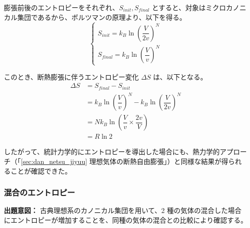\documentclass[uplatex,dvipdfmx,a4paper,11pt]{jsarticle}
\begin{document}
膨張前後のエントロピーをそれぞれ、$S_{init}, S_{final}$ とすると、対象はミクロカノニカル集団であるから、ボルツマンの原理より、以下を得る。
\begin{equation*}
\begin{cases}
S_{init} = k_B \ln \left( \dfrac{V}{2v} \right)^N \\[10pt]
S_{final} = k_B \ln\left( \dfrac{V}{v} \right)^N
\end{cases}
\end{equation*}

このとき、断熱膨張に伴うエントロピー変化 $\Delta S$ は、以下となる。
\begin{align*}
\Delta S 
	&= S_{final} - S_{init} \\
	&= k_B \ln\left( \dfrac{V}{v} \right)^N - k_B \ln \left( \dfrac{V}{2v} \right)^N \\
	&= N k_B \ln \left( \dfrac{V}{v} \times \dfrac{2v}{V}\right) \\
	&= R \ln 2
\end{align*}

したがって、統計力学的にエントロピーを導出した場合にも、熱力学的アプローチ（「\ref{sec:dan_netsu_jiyuu} 理想気体の断熱自由膨張」）と同様な結果が得られることが確認できた。

\newpage

\subsubsection{混合のエントロピー}

\begin{boxnote}
{\bf 出題意図：}
古典理想系のカノニカル集団を用いて、2 種の気体の混合した場合にエントロピーが増加することを、同種の気体の混合との比較により確認する。
\end{boxnote}
\end{document}
